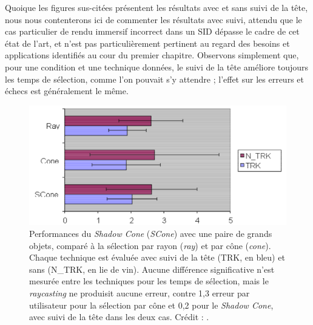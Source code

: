	Quoique les figures sus-citées présentent les résultats avec et sans suivi de la tête, nous nous contenterons ici de commenter les résultats avec suivi, attendu que le cas particulier de rendu immersif incorrect dans un SID dépasse le cadre de cet état de l'art, et n'est pas particulièrement pertinent au regard des besoins et applications identifiés au cour du premier chapitre. Observons simplement que, pour une condition et une technique données, le suivi de la tête améliore toujours les temps de sélection, comme l'on pouvait s'y attendre ; l'effet sur les erreurs et échecs est généralement le même.
	
	\begin{figure}[H]
		\centering
		\includegraphics[width=\textwidth]{figures/ch2/shadowPLarge}
		\caption[Performances du \emph{Shadow Cone} --- Paire de grands objets]{Performances du \emph{Shadow Cone} (\emph{SCone}) avec une paire de grands objets, comparé à la sélection par rayon (\emph{ray}) et par cône (\emph{cone}). Chaque technique est évaluée avec suivi de la tête (TRK, en bleu) et sans (N\_{}TRK, en lie de vin). Aucune différence significative n'est mesurée entre les techniques pour les temps de sélection, mais le \emph{raycasting} ne produisit aucune erreur, contre 1,3 erreur par utilisateur pour la sélection par cône et 0,2 pour le \emph{Shadow Cone}, avec suivi de la tête dans les deux cas. Crédit : \cite{steed20043d}.}
		\label{fig:shadowPLarge}
	\end{figure}
	

